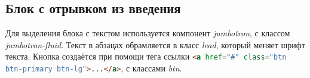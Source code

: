 \subsection{Блок с отрывком из введения}
Для выделения блока с текстом используется компонент \textit{jumbotron}, с классом \textit{jumbotron-fluid}. Текст в абзацах обрамляется в класс \textit{lead}, который меняет шрифт текста. Кнопка создаётся при помощи тега ссылки \lstinline[language=HTML]{<a href="#" class="btn btn-primary btn-lg">...</a>}, с классами \textit{btn}.